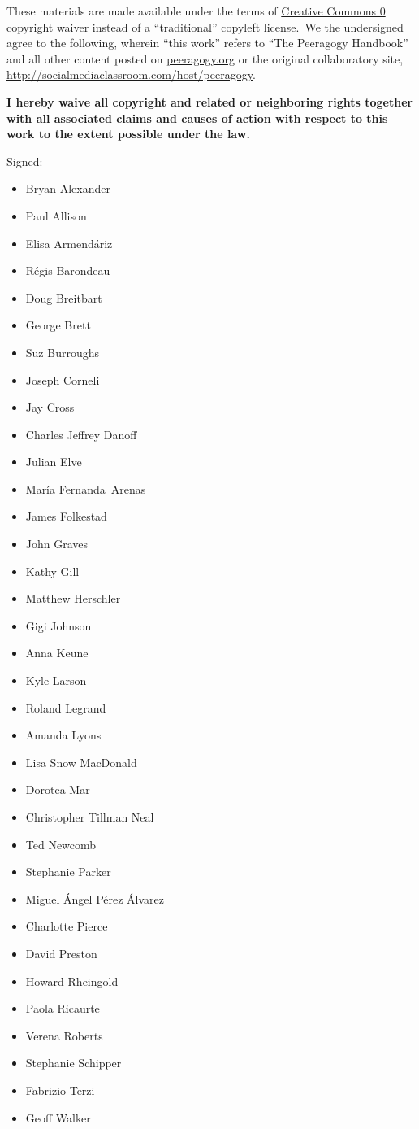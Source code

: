These materials are made available under the terms of
\href{http://creativecommons.org/publicdomain/zero/1.0/}{Creative
Commons 0 copyright waiver} instead of a ``traditional'' copyleft
license.~We the undersigned agree to the following, wherein ``this
work'' refers to ``The Peeragogy Handbook'' and all other content posted
on \href{http://peeragogy.org}{peeragogy.org} or the original
collaboratory site,
\href{http://socialmediaclassroom.com/host/peeragogy}{http://socialmediaclassroom.com/host/peeragogy}.

\textbf{I hereby waive all copyright and related or neighboring rights
together with all associated claims and causes of action with respect to
this work to the extent possible under the law.}

Signed:

\begin{itemize}
\itemsep1pt\parskip0pt
\item
  Bryan Alexander
\item
  Paul Allison
\item
  Elisa Armend\'ariz
\item
  Régis Barondeau
\item
  Doug Breitbart
\item
  George Brett
\item
  Suz Burroughs
\item
  Joseph Corneli
\item
  Jay Cross
\item
  Charles Jeffrey Danoff
\item
  Julian Elve
\item
  María Fernanda~Arenas
\item
  James Folkestad
\item
  John Graves
\item
  Kathy Gill
\item
  Matthew Herschler
\item
  Gigi Johnson
\item
  Anna Keune
\item
  Kyle Larson
\item
  Roland Legrand
\item
  Amanda Lyons
\item
  Lisa Snow MacDonald
\item
  Dorotea Mar
\item
  Christopher Tillman Neal
\item
  Ted Newcomb
\item
  Stephanie Parker
\item
  Miguel \'Angel P\'erez \'Alvarez
\item
  Charlotte Pierce
\item
  David Preston
\item
  Howard Rheingold
\item
  Paola Ricaurte
\item
  Verena Roberts
\item
  Stephanie Schipper
\item
  Fabrizio Terzi
\item
  Geoff Walker
\end{itemize}

